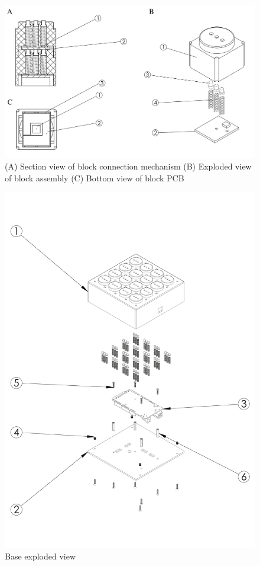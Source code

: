\documentclass[]{article}
\begin{document}
\pagebreak
\begin{figure}
	\includegraphics[width=\textwidth]{Figures/single_block}
	\caption{(A) Section view of block connection mechanism (B) Exploded view of block assembly (C) Bottom view of block PCB}
	\label{fig:block}
\end{figure}


\begin{figure}[h!]
	\includegraphics[width=\textwidth]{Figures/base}
	\caption{Base exploded view}
\end{figure}
\end{document}
